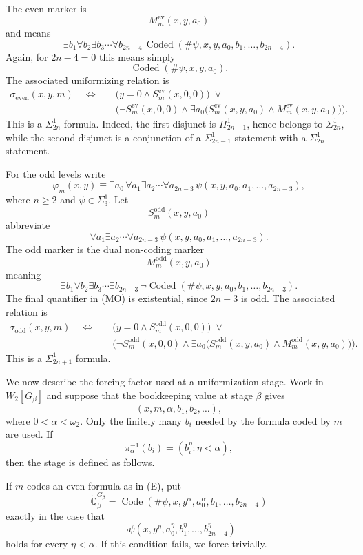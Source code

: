 \documentclass[a4paper,11pt]{article}
\newcommand{\forceQ}{\mathbb{Q}}
\begin{document}
The even marker is
\[
M^{\mathrm{ev}}_m(x,y,a_0)
\]
and means
\[
\exists b_1\forall b_2\exists b_3\cdots\forall b_{2n-4}\,
\operatorname{Coded}(\#\psi,x,y,a_0,b_1,\ldots,b_{2n-4}).
\tag{ME}
\]
Again, for $2n-4=0$ this means simply
\[
\operatorname{Coded}(\#\psi,x,y,a_0).
\]
The associated uniformizing relation is
\begin{align*}
\sigma_{\mathrm{even}}(x,y,m)\quad\Longleftrightarrow\quad
&\bigl(y=0\wedge S^{\mathrm{ev}}_m(x,0,0)\bigr)\;\lor\; \\
&\bigl(\neg S^{\mathrm{ev}}_m(x,0,0)\wedge
\exists a_0\bigl(S^{\mathrm{ev}}_m(x,y,a_0)\wedge M^{\mathrm{ev}}_m(x,y,a_0)\bigr)\bigr).
\end{align*}
This is a $\Sigma^1_{2n}$ formula.  Indeed, the first disjunct is $\Pi^1_{2n-1}$, hence belongs to $\Sigma^1_{2n}$, while the second disjunct is a conjunction of a $\Sigma^1_{2n-1}$ statement with a $\Sigma^1_{2n}$ statement.

For the odd levels write
\[
\varphi_m(x,y)\equiv
\exists a_0\,\forall a_1\exists a_2\cdots\forall a_{2n-3}\,
\psi(x,y,a_0,a_1,\ldots,a_{2n-3}),
\tag{O}
\]
where $n\geq 2$ and $\psi\in\Sigma^1_3$.  Let
\[
S^{\mathrm{odd}}_m(x,y,a_0)
\]
abbreviate
\[
\forall a_1\exists a_2\cdots\forall a_{2n-3}\,
\psi(x,y,a_0,a_1,\ldots,a_{2n-3}).
\]
The odd marker is the dual non-coding marker
\[
M^{\mathrm{odd}}_m(x,y,a_0)
\]
meaning
\[
\exists b_1\forall b_2\exists b_3\cdots\exists b_{2n-3}\,
\neg\operatorname{Coded}(\#\psi,x,y,a_0,b_1,\ldots,b_{2n-3}).
\tag{MO}
\]
The final quantifier in (MO) is existential, since $2n-3$ is odd.  The associated relation is
\begin{align*}
\sigma_{\mathrm{odd}}(x,y,m)\quad\Longleftrightarrow\quad
&\bigl(y=0\wedge S^{\mathrm{odd}}_m(x,0,0)\bigr)\;\lor\; \\
&\bigl(\neg S^{\mathrm{odd}}_m(x,0,0)\wedge
\exists a_0\bigl(S^{\mathrm{odd}}_m(x,y,a_0)\wedge M^{\mathrm{odd}}_m(x,y,a_0)\bigr)\bigr).
\end{align*}
This is a $\Sigma^1_{2n+1}$ formula.

We now describe the forcing factor used at a uniformization stage.  Work in $W_2[G_\beta]$ and suppose that the bookkeeping value at stage $\beta$ gives
\[
(x,m,\alpha,b_1,b_2,\ldots),
\]
where $0<\alpha<\omega_2$.  Only the finitely many $b_i$ needed by the formula coded by $m$ are used.  If
\[
\pi_\alpha^{-1}(b_i)=(b_i^\eta:\eta<\alpha),
\]
then the stage is defined as follows.

If $m$ codes an even formula as in (E), put
\[
\dot{\forceQ}_\beta^{G_\beta}=
\operatorname{Code}(\#\psi,x,y^\alpha,a_0^\alpha,b_1,\ldots,b_{2n-4})
\]
exactly in the case that
\[
\neg\psi(x,y^\eta,a_0^\eta,b_1^\eta,\ldots,b_{2n-4}^\eta)
\]
holds for every $\eta<\alpha$.  If this condition fails, we force trivially.
\end{document}

